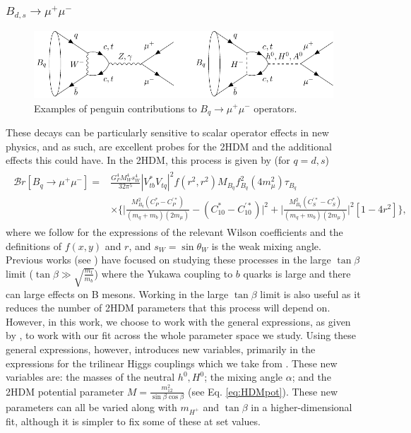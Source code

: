 \documentclass[a4paper,12pt]{article}
\begin{document}
\subsubsection{$B_{d,s}\to\mu^+\mu^-$}
\begin{figure}[ht]
    \centering
    \includegraphics[width=\textwidth]{bsmu.pdf}
    \caption{\label{fig:bspeng}Examples of penguin contributions to $B_q\to\mu^+\mu^-$ operators.}
\end{figure}
These decays can be particularly sensitive to scalar operator effects in new physics, and as such, are excellent probes for the 2HDM and the additional effects this could have. 
In the 2HDM, this process is given by (for $q=d,s$)
\begin{align}
    \begin{split}
        \mathcal{B}r[B_{q}\to\mu^+\mu^-] = &\frac{G^4_FM_W^4s_W^4}{32\pi^5}|V_{tb}^*V_{tq}|^2f(r^2,r^2)M_{B_q}f_{B_q}^2(4m_\mu^2)\tau_{B_q} \\
                                           &\times\Bigg\{\bigg|\frac{M_{B_q}^2(C_P^*-C_P^{'*})}{(m_q+m_b)(2m_\mu)}-(C_{10}^*-C_{10}^{'*})\bigg|^2 +\bigg|\frac{M_{B_q}^2(C_S^{'*}-C_S^*)}{(m_q+m_b)(2m_\mu)}\bigg|^2\left[1-4r^2\right]\Bigg\},
    \end{split}
\end{align}
where we follow \cite{criv} for the expressions of the relevant Wilson coefficients and the definitions of $f(x,y)$ and $r$, and $s_W=\sin\theta_W$ is the weak mixing angle. 
Previous works (see \cite{lrgtb}) have focused on studying these processes in the large $\tan\beta$ limit ($\tan\beta\gg\sqrt{\frac{m_t}{m_b}}$) where the Yukawa coupling to $b$ quarks is large and there can large effects on B mesons. 
Working in the large $\tan\beta$ limit is also useful as it reduces the number of 2HDM parameters that this process will depend on. 
However, in this work, we choose to work with the general expressions, as given by \cite{criv}, to work with our fit across the whole parameter space we study. 
Using these general expressions, however, introduces new variables, primarily in the expressions for the trilinear Higgs couplings which we take from \cite{trilin}.
These new variables are: the masses of the neutral $h^0,H^0$; the mixing angle $\alpha$; and the 2HDM potential parameter $M=\frac{m_{12}^2}{\sin\beta\cos\beta}$ (see Eq. \ref{eq:HDMpot}). 
These new parameters can all be varied along with $m_{H^+}$ and $\tan\beta$ in a higher-dimensional fit, although it is simpler to fix some of these at set values. 
\end{document}
